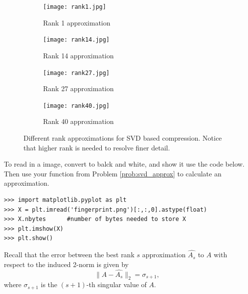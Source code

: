 \begin{figure}
\centering
\begin{subfigure}[b]{.49\textwidth}
\centering
\texttt{[image: rank1.jpg]}
\caption{Rank 1 approximation}
\end{subfigure}
\begin{subfigure}[b]{.49\textwidth}
\centering
\texttt{[image: rank14.jpg]}
\caption{Rank 14 approximation}
\end{subfigure}

\begin{subfigure}[b]{.49\textwidth}
\centering
\texttt{[image: rank27.jpg]}
\caption{Rank 27 approximation}
\end{subfigure}
\begin{subfigure}[b]{.49\textwidth}
\centering
\texttt{[image: rank40.jpg]}
\caption{Rank 40 approximation}
\end{subfigure}
\caption{Different rank approximations for SVD based compression.  Notice that higher rank is needed to resolve finer detail.}
\label{fig:rankvalues}
\end{figure}



To read in a image, convert to balck and white, and show it use the code below.
Then use your function from Problem \ref{prob:svd_approx} to calculate an approximation.
\begin{lstlisting}
>>> import matplotlib.pyplot as plt
>>> X = plt.imread('fingerprint.png')[:,:,0].astype(float)
>>> X.nbytes      #number of bytes needed to store X
>>> plt.imshow(X)
>>> plt.show()
\end{lstlisting}

Recall that the error between the best rank $s$ approximation $\widehat{A_s}$ to $A$ with respect to the induced 
2-norm is given by
$$
\|A - \widehat{A_s}\|_2 = \sigma_{s+1},
$$
where $\sigma_{s+1}$ is the $(s+1)$-th singular value of $A$. 


